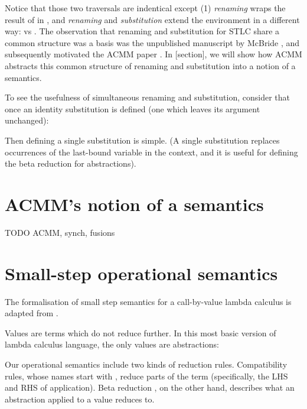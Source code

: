 \documentclass[bsc,frontabs,oneside,singlespacing,parskip,deptreport]{infthesis}
\theoremstyle{definition}
\begin{document}

Notice that those two traversals are indentical except (1)
\textit{renaming} wraps the result of  in , and
\textit{renaming} and \textit{substitution} extend the environment in
a different way:  vs . The observation that renaming and substitution for STLC share a
common structure was a basis was the unpublished manuscript by McBride
\cite{mcbride2005type}, and subsequently motivated the ACMM paper
\cite{DBLP:conf/cpp/Allais0MM17}. In [section], we will show how ACMM
abstracts this common structure of renaming and substitution into a
notion of a semantics.

To see the usefulness of simultaneous renaming and substitution,
consider that once an identity substitution is defined (one which
leaves its argument unchanged):


Then defining a single substitution is simple. (A single substitution
replaces occurrences of the last-bound variable in the context, and it
is useful for defining the beta reduction for abstractions).


\section{ACMM's notion of a semantics}

TODO ACMM, synch, fusions

\section{Small-step operational semantics}

The formalisation of small step semantics for a call-by-value lambda
calculus is adapted from \cite{DBLP:conf/sbmf/Wadler18}.

Values are terms which do not reduce further. In this most basic
version of lambda calculus language, the only values are abstractions:


Our operational semantics include two kinds of reduction rules. Compatibility rules, whose
names start with , reduce parts of the term (specifically, the LHS
and RHS of application). Beta reduction , on the other hand,
describes what an abstraction applied to a value reduces to.
\end{document}
